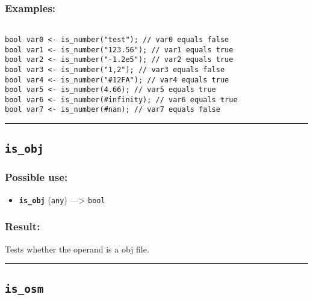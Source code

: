 \documentclass[]{book}
\providecommand{\tightlist}{%
  \setlength{\itemsep}{0pt}\setlength{\parskip}{0pt}}
\theoremstyle{definition}
\theoremstyle{definition}
\theoremstyle{definition}
\theoremstyle{remark}
\begin{document}
\subsubsection{Examples:}\label{examples-216}

\begin{verbatim}
 
bool var0 <- is_number("test"); // var0 equals false 
bool var1 <- is_number("123.56"); // var1 equals true 
bool var2 <- is_number("-1.2e5"); // var2 equals true 
bool var3 <- is_number("1,2"); // var3 equals false 
bool var4 <- is_number("#12FA"); // var4 equals true 
bool var5 <- is_number(4.66); // var5 equals true 
bool var6 <- is_number(#infinity); // var6 equals true 
bool var7 <- is_number(#nan); // var7 equals false
\end{verbatim}

\begin{center}\rule{0.5\linewidth}{\linethickness}\end{center}

\subsection{\texorpdfstring{\texttt{is\_obj}}{is\_obj}}\label{is_obj}

\subsubsection{Possible use:}\label{possible-use-297}

\begin{itemize}
\tightlist
\item
  \textbf{\texttt{is\_obj}} (\texttt{any}) ---\textgreater{}
  \texttt{bool}
\end{itemize}

\subsubsection{Result:}\label{result-287}

Tests whether the operand is a obj file.

\begin{center}\rule{0.5\linewidth}{\linethickness}\end{center}

\subsection{\texorpdfstring{\texttt{is\_osm}}{is\_osm}}\label{is_osm}
\end{document}
